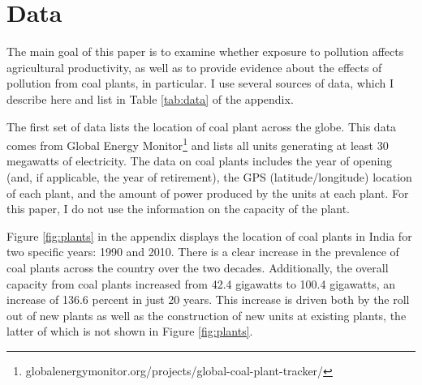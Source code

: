 \documentclass[
]{article}
\begin{document}
\hypertarget{data}{%
\section{Data}\label{data}}

\label{data}

The main goal of this paper is to examine whether exposure to pollution affects agricultural productivity, as well as to provide evidence about the effects of pollution from coal plants, in particular. I use several sources of data, which I describe here and list in Table \ref{tab:data} of the appendix.

The first set of data lists the location of coal plant across the globe. This data comes from Global Energy Monitor\footnote{globalenergymonitor.org/projects/global-coal-plant-tracker/} and lists all units generating at least 30 megawatts of electricity. The data on coal plants includes the year of opening (and, if applicable, the year of retirement), the GPS (latitude/longitude) location of each plant, and the amount of power produced by the units at each plant. For this paper, I do not use the information on the capacity of the plant.

Figure \ref{fig:plants} in the appendix displays the location of coal plants in India for two specific years: 1990 and 2010. There is a clear increase in the prevalence of coal plants across the country over the two decades. Additionally, the overall capacity from coal plants increased from 42.4 gigawatts to 100.4 gigawatts, an increase of 136.6 percent in just 20 years. This increase is driven both by the roll out of new plants as well as the construction of new units at existing plants, the latter of which is not shown in Figure \ref{fig:plants}.
\end{document}

